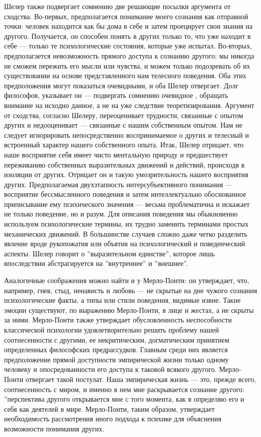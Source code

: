 \documentclass[11pt]{book}
\begin{document}
Шелер также подвергает сомнению две решающие посылки аргумента от сходства. Во-первых, предполагается понимание моего сознания как отправной точки: человек находится как бы дома в себе и затем проецирует свои знания на другого. Получается, он способен понять в других только то, что уже находит в себе --- только те психологические состояния, которые уже испытал. Во-вторых, предполагается невозможность прямого доступа к сознанию другого: мы никогда не сможем пережить его мысли или чувства, и можем только подозревать об их существовании на основе представленного нам телесного поведения. Оба этих предположения могут показаться очевидными, и оба Шелер отвергает. Долг философов, указывает он --- подвергать сомнению очевидное , обращать внимание на исходно данное, а не на уже следствие теоретизирования. Аргумент от сходства, согласно Шелеру, переоценивает трудности, связанные с опытом других и недооценивает --- связанные с нашим собственным опытом. Нам не следует игнорировать непосредственно воспринимаемое о других и телесный и встроенный характер нашего собственного опыта. Итак, Шелер отрицает, что наше восприятие себя имеет чисто ментальную природу и предшествует переживанию собственных выразительных движений и действий, происходя в изоляции от других. Отрицает он и такую умозрительность нашего восприятия других. Предполагаемая двухэтапность интерсубъективного понимания --- восприятие бессмысленного поведения и затем интеллектуально обоснованное приписывание ему психического значения --- весьма проблематична и искажает не только поведение, но и разум. Для описания поведения мы обыкновенно используем психологические термины, их трудно заменить терминами простых механических движений. В большинстве случаев сложно даже четко разделить явление вроде рукопожатия или объятия на психологический и поведенческий аспекты. Шелер говорит о ''выразительном единстве'', которое лишь впоследствии абстрагируется на ''внутреннее'' и ''внешнее''.

Аналогичные соображения можно найти и у Мерло-Понти: он утверждает, что, например, гнев, стыд, ненависть и любовь --- не скрытые на дне чужого сознания психологические факты, а типы или стили поведения, видимые извне. Такие эмоции существуют, по выражению Мерло-Понти, в лице и жестах, а не скрыты за ними. Мерло-Понти также утверждает обусловленность неспособности классической психологии удовлетворительно решить проблему нашей соотнесенности с другими, ее некритическим, догматическим принятием определенных философских предрассудков. Главным среди них является предположение прямой доступности эмпирической жизни только одному человеку и опосредованности его доступа к таковой всякого другого. Мерло-Понти отвергает такой постулат. Наша эмпирическая жизнь --- это, прежде всего, соотнесенность с миром, и именно в нем мне раскрывается сознание другого: ''перспектива другого открывается мне с того момента, как я определяю его и себя как деятелей в мире. Мерло-Понти, таким образом, утверждает необходимость рассмотрения иного подхода к психике для объяснения возможности понимания других.
\end{document}
